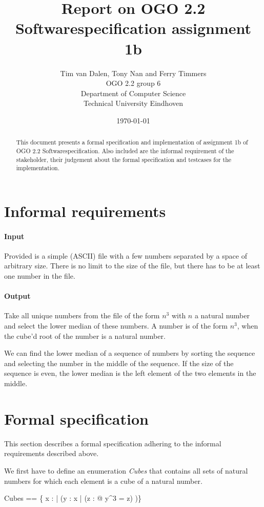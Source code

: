 \documentclass[12pt]{article}
\title{Report on OGO 2.2 Softwarespecification assignment 1b}
\author{
        Tim van Dalen, Tony Nan and Ferry Timmers\\ OGO 2.2 group 6 \\
                Department of Computer Science\\
        Technical University Eindhoven\\
}
\date{\today}
\begin{document}
\maketitle

\begin{abstract}
This document presents a formal specification and implementation of assignment 1b of OGO 2.2 Softwarespecification. Also included are the informal requirement of the stakeholder, their judgement about the formal specification and testcases for the implementation.
\end{abstract}

\section{Informal requirements}
\paragraph{Input} Provided is a simple (ASCII) file with a few numbers separated by a space of arbitrary size. There is no limit to the size of the file, but there has to be at least one number in the file.

\paragraph{Output} Take all unique numbers from the file of the form $n^3$ with $n$ a natural number and select the lower median of these numbers. A number is of the form $n^3$, when the cube'd root of the number is a natural number.

We can find the lower median of a sequence of numbers by sorting the sequence and selecting the number in the middle of the sequence. If the size of the sequence is even, the lower median is the left element of the two elements in the middle.

\section{Formal specification}

This section describes a formal specification adhering to the informal requirements described above.

We first have to define an enumeration \textit{Cubes} that contains all sets of natural numbers for which each element is a cube of a natural number.
\begin{axdef}
Cubes == \{ x : \power \nat | (\forall y : x | (\exists z : \nat @ y^3 = z) )\}
\end{axdef}
\end{document}
